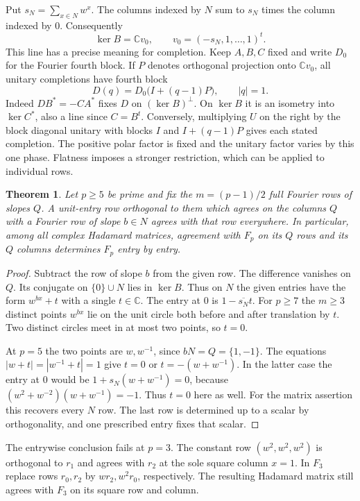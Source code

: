\documentclass[11pt,a4paper]{article}
\newtheorem{theorem}{Theorem}[section]
\numberwithin{equation}{section}
\begin{document}
Put $s_N=\sum_{x\in N}w^x$. The columns indexed by $N$ sum to $s_N$ times the column indexed by $0$. Consequently
$$\ker B=\mathbb C v_0,\qquad v_0=(-s_N,1,\ldots,1)^t.$$
This line has a precise meaning for completion. Keep $A,B,C$ fixed and write $D_0$ for the Fourier fourth block. If $P$ denotes orthogonal projection onto $\mathbb C v_0$, all unitary completions have fourth block
$$D(q)=D_0\big(I+(q-1)P\big),\qquad |q|=1.$$
Indeed $DB^*=-CA^*$ fixes $D$ on $(\ker B)^\perp$. On $\ker B$ it is an isometry into $\ker C^*$, also a line since $C=B^t$. Conversely, multiplying $U$ on the right by the block diagonal unitary with blocks $I$ and $I+(q-1)P$ gives each stated completion. The positive polar factor is fixed and the unitary factor varies by this one phase. Flatness imposes a stronger restriction, which can be applied to individual rows.

\begin{theorem}\label{prime:polar-row}
Let $p\ge5$ be prime and fix the $m=(p-1)/2$ full Fourier rows of slopes $Q$. A unit-entry row orthogonal to them which agrees on the columns $Q$ with a Fourier row of slope $b\in N$ agrees with that row everywhere. In particular, among all complex Hadamard matrices, agreement with $F_p$ on its $Q$ rows and its $Q$ columns determines $F_p$ entry by entry.
\end{theorem}
\begin{proof}
Subtract the row of slope $b$ from the given row. The difference vanishes on $Q$. Its conjugate on $\{0\}\cup N$ lies in $\ker B$. Thus on $N$ the given entries have the form $w^{bx}+t$ with a single $t\in\mathbb C$. The entry at $0$ is $1-\overline{s_N}t$. For $p\ge7$ the $m\ge3$ distinct points $w^{bx}$ lie on the unit circle both before and after translation by $t$. Two distinct circles meet in at most two points, so $t=0$.

At $p=5$ the two points are $w,w^{-1}$, since $bN=Q=\{1,-1\}$. The equations $|w+t|=|w^{-1}+t|=1$ give $t=0$ or $t=-(w+w^{-1})$. In the latter case the entry at $0$ would be $1+s_N(w+w^{-1})=0$, because $(w^2+w^{-2})(w+w^{-1})=-1$. Thus $t=0$ here as well. For the matrix assertion this recovers every $N$ row. The last row is determined up to a scalar by orthogonality, and one prescribed entry fixes that scalar.
\end{proof}

The entrywise conclusion fails at $p=3$. The constant row $(w^2,w^2,w^2)$ is orthogonal to $r_1$ and agrees with $r_2$ at the sole square column $x=1$. In $F_3$ replace rows $r_0,r_2$ by $w r_2,w^2 r_0$, respectively. The resulting Hadamard matrix still agrees with $F_3$ on its square row and column.
\end{document}
